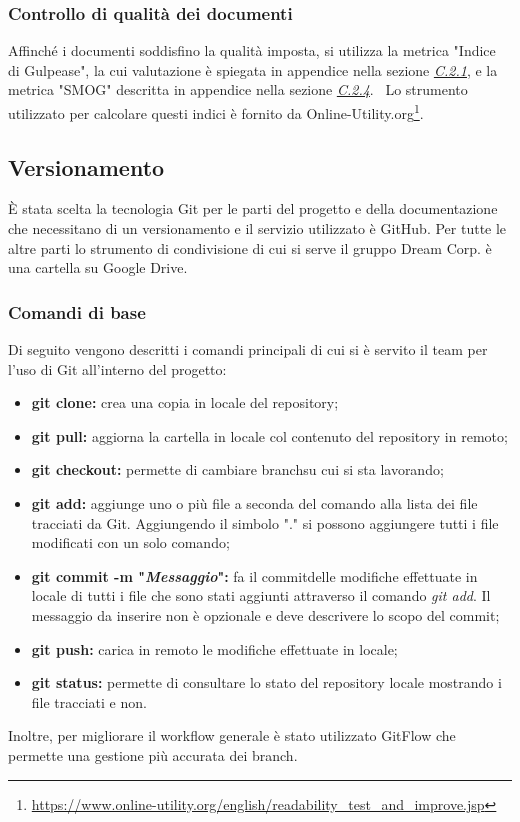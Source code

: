 \subsubsection{Controllo di qualità dei documenti}
Affinché i documenti soddisfino la qualità imposta, si utilizza la metrica "Indice di Gulpease", la cui valutazione è spiegata in appendice nella sezione \hyperref[C.2.1]{\textit{\underline{C.2.1}}}, e la metrica "SMOG" descritta in appendice nella sezione  \hyperref[C.2.4]{\textit{\underline{C.2.4}}}.~\newline
Lo strumento utilizzato per calcolare questi indici è fornito da Online-Utility.org\footnote{\url{https://www.online-utility.org/english/readability_test_and_improve.jsp}}.
	\subsection{Versionamento}
		È stata scelta la tecnologia Git per le parti del progetto e della documentazione che necessitano di un versionamento e il servizio utilizzato è GitHub. Per tutte le altre parti lo strumento di condivisione di cui si serve il gruppo Dream Corp. è una cartella su Google Drive\pedice.
		\subsubsection{Comandi di base}
			Di seguito vengono descritti i comandi principali di cui si è servito il team per l'uso di Git all'interno del progetto:
			\begin{itemize}
				\item \textbf{git clone:} crea una copia in locale del repository\pedice;
				\item \textbf{git pull:} aggiorna la cartella in locale col contenuto del repository in remoto;
				\item \textbf{git checkout:} permette di cambiare branch\pedice su cui si sta lavorando;
				\item \textbf{git add:} aggiunge uno o più file a seconda del comando alla lista dei file tracciati da Git. Aggiungendo il simbolo "." si possono aggiungere tutti i file modificati con un solo comando;
				\item \textbf{git commit -m "\textit{Messaggio}":} fa il commit\pedice delle modifiche effettuate in locale di tutti i file che sono stati aggiunti attraverso il comando \textit{git add}. Il messaggio da inserire non è opzionale e deve descrivere lo scopo del commit;
				\item \textbf{git push:} carica in remoto le modifiche effettuate in locale;
				\item \textbf{git status:} permette di consultare  lo stato del repository locale mostrando i file tracciati e non. \newline
			\end{itemize}
			Inoltre, per migliorare il workflow generale è stato utilizzato GitFlow che permette una gestione più accurata dei branch.
